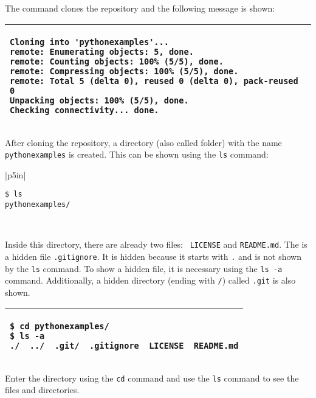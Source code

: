The command clones the repository and the following message is shown:

\vspace{0.2in}

\noindent
\begin{tabular}{|p{5in}|}\hline
\begin{verbatim}
Cloning into 'pythonexamples'...
remote: Enumerating objects: 5, done.
remote: Counting objects: 100% (5/5), done.
remote: Compressing objects: 100% (5/5), done.
remote: Total 5 (delta 0), reused 0 (delta 0), pack-reused 0
Unpacking objects: 100% (5/5), done.
Checking connectivity... done.
\end{verbatim}
\\ \hline
\end{tabular}
\vspace{0.2in}

After cloning the repository, a directory (also called folder) with
the name {\tt pythonexamples} is created.  This can be shown
using the {\tt ls} command:

\vspace{0.2in}

\noindent
\begin{tabular}{|p{5in}|}\hline
\begin{verbatim}
$ ls
pythonexamples/
\end{verbatim}
\\ \hline
\end{tabular}
\vspace{0.2in}

Inside this directory, there are already two files: {\tt
  LICENSE} and {\tt README.md}. The is a hidden file {\tt .gitignore}.
It is hidden because it starts with {\tt .} and is not shown by the
{\tt ls} command. To show a hidden file, it is necessary using the
{\tt ls -a} command. Additionally, a hidden directory (ending with
{\tt /}) called {\tt .git} is also shown.

\vspace{0.2in}

\noindent
\begin{tabular}{|p{5in}|}\hline
\begin{verbatim}
$ cd pythonexamples/
$ ls -a
./  ../  .git/	.gitignore  LICENSE  README.md
\end{verbatim}
\\ \hline
\end{tabular}
\vspace{0.2in}

Enter the directory using the {\tt cd} command
and use the {\tt ls} command to see the files and directories.

